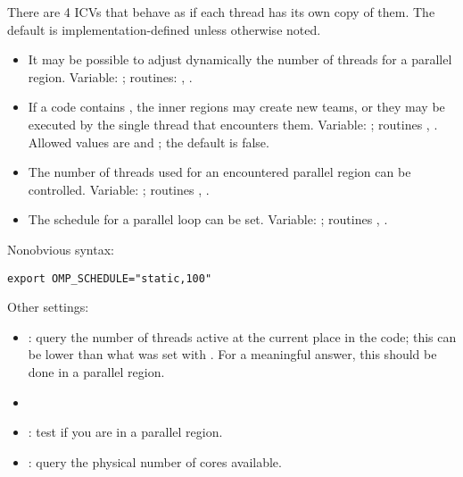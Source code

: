 There are 4 \acp{ICV} that behave as if each thread has its own copy of them.
The default is implementation-defined unless otherwise noted.
\begin{itemize}
  \item It may be possible to adjust dynamically the number of threads
    for a parallel region. Variable: ;
    routines: ,
    .
  \item If a code contains ,
    the inner regions may create new teams, or they may be executed by
    the single thread that encounters them. Variable:
    ; routines ,
    . Allowed values are  and
    ; the default is false.
  \item The number of threads used for an encountered parallel region
    can be controlled. Variable: ;
    routines ,
    .
  \item The schedule for a parallel loop can be set. Variable:
    ; routines
    , .
\end{itemize}

Nonobvious syntax:
\begin{verbatim}
export OMP_SCHEDULE="static,100"
\end{verbatim}

Other settings:
\begin{itemize}
\item{}: query the number of threads
  active at the current place in the code; this can be lower than what
  was set with . For a meaningful answer, this
  should be done in a parallel region.
\item{}
\item{}: test if you are in a parallel
  region.
\item{}: query the physical number of cores available.
\end{itemize}

